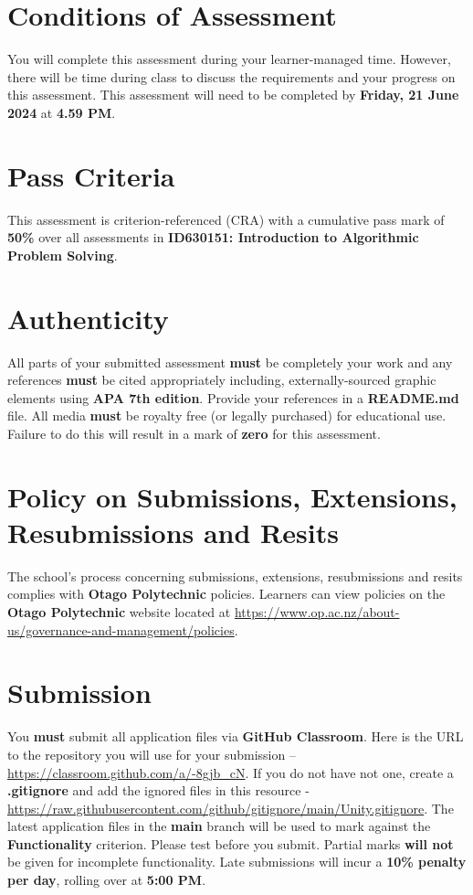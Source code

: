 \documentclass{article}
\begin{document}
\section*{Conditions of Assessment}
You will complete this assessment during your learner-managed time. However, there will be time during class to discuss the requirements and your progress on this assessment. This assessment will need to be completed by \textbf{Friday, 21 June 2024} at \textbf{4.59 PM}. 

\section*{Pass Criteria}
This assessment is criterion-referenced (CRA) with a cumulative pass mark of \textbf{50\%} over all assessments in \textbf{ID630151: Introduction to Algorithmic Problem Solving}.

\section*{Authenticity}
All parts of your submitted assessment \textbf{must} be completely your work and any references \textbf{must} be cited appropriately including, externally-sourced graphic elements using \textbf{APA 7th edition}. Provide your references in a \textbf{README.md} file. All media \textbf{must} be royalty free (or legally purchased) for educational use. Failure to do this will result in a mark of \textbf{zero} for this assessment.

\section*{Policy on Submissions, Extensions, Resubmissions and Resits}
The school's process concerning submissions, extensions, resubmissions and resits complies with \textbf{Otago Polytechnic} policies. Learners can view policies on the \textbf{Otago Polytechnic} website located at \href{https://www.op.ac.nz/about-us/governance-and-management/policies}{https://www.op.ac.nz/about-us/governance-and-management/policies}.

\section*{Submission}
You \textbf{must} submit all application files via \textbf{GitHub Classroom}. Here is the URL to the repository you will use for your submission – \href{https://classroom.github.com/a/-8gjb\_cN}{https://classroom.github.com/a/-8gjb\_cN}. If you do not have not one, create a \textbf{.gitignore} and add the ignored files in this resource - \href{https://raw.githubusercontent.com/github/gitignore/main/Unity.gitignore}{https://raw.githubusercontent.com/github/gitignore/main/Unity.gitignore}. The latest application files in the \textbf{main} branch will be used to mark against the \textbf{Functionality} criterion. Please test before you submit. Partial marks \textbf{will not} be given for incomplete functionality. Late submissions will incur a \textbf{10\% penalty per day}, rolling over at \textbf{5:00 PM}.
\end{document}
